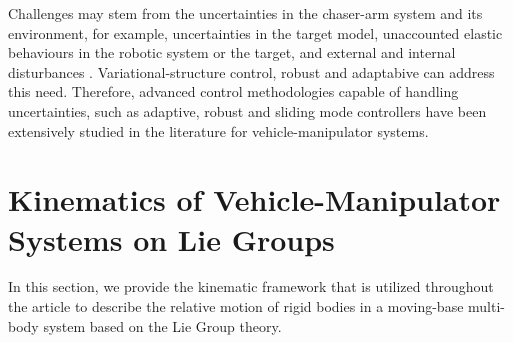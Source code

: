 \documentclass[lettersize,journal]{IEEEtran}
\begin{document}
Challenges may stem from the uncertainties in the chaser-arm system and its environment, for example, uncertainties in the target model\cite{Abiko}, unaccounted elastic behaviours in the robotic system or the target\cite{Sharf1995,ishijima2005orbit}, and external and internal disturbances\cite{guo2008terminal,Hrobustdevelopment} . Variational-structure control\cite{Wei2011,Saaj2014}{}, robust and adaptabive\cite{Ulrich2015,Ulrich2014a,Sasiadek1988} can address this need.
Therefore, advanced control methodologies capable of handling uncertainties, such as adaptive, robust and sliding mode controllers\cite{saaj2002new,Ulrich2010,Ulrich2014} have been extensively studied in the literature for vehicle-manipulator systems. 

\section{Kinematics of Vehicle-Manipulator Systems on Lie Groups}
\label{math} %
In this section, we provide the kinematic framework that is utilized throughout the article to describe the relative motion of rigid bodies in a moving-base multi-body system based on the Lie Group theory. 
\end{document}

